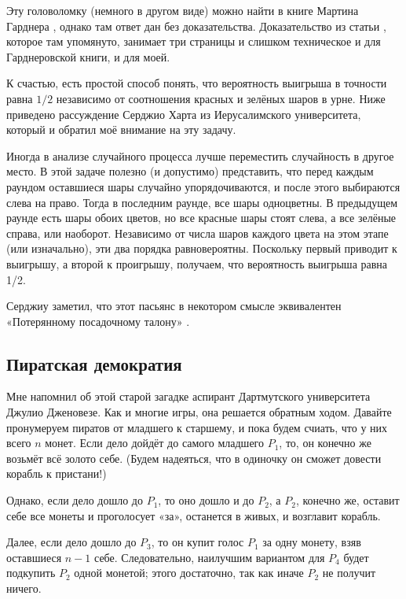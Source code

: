 Эту головоломку (немного в другом виде) можно найти в книге Мартина Гарднера \cite[2.16]{gardner2005}, однако там ответ дан без доказательства.
Доказательство из статьи \cite{oakley-perry}, которое там упомянуто, занимает три страницы и слишком техническое и для Гарднеровской книги, и для моей.

К счастью, есть простой способ понять, что вероятность выигрыша в точности равна $1/2$ независимо от соотношения красных и зелёных шаров в урне.
Ниже приведено рассуждение Серджио Харта из Иерусалимского университета, который и обратил моё внимание на эту задачу.

Иногда в анализе случайного процесса лучше переместить случайность в другое место.
В этой задаче полезно (и допустимо) представить, что перед каждым раундом оставшиеся шары случайно упорядочиваются, и после этого выбираются слева на право.
Тогда в последним раунде, все шары одноцветны.
В предыдущем раунде есть шары обоих цветов, но все красные шары стоят слева, а все зелёные справа, или наоборот.
Независимо от числа шаров каждого цвета на этом этапе (или изначально), эти два порядка равновероятны.
Поскольку первый приводит к выигрышу, а второй к проигрышу, получаем, что вероятность выигрыша равна 1/2.

Серджиу заметил, что этот пасьянс в некотором смысле эквивалентен «Потерянному посадочному талону» \cite[p. 35]{winkler}.

\subsection*{Пиратская демократия}

Мне напомнил об этой старой загадке аспирант Дартмутского университета Джулио Дженовезе.
Как и многие игры, она решается обратным ходом.
Давайте пронумеруем пиратов от младшего к старшему, и пока будем счиать, что у них всего $n$ монет.
Если дело дойдёт до самого младшего $P_1$, то, он конечно же возьмёт всё золото себе.
(Будем надеяться, что в одиночку он сможет довести корабль к пристани!)

Однако, если дело дошло до $P_1$, то оно дошло и до $P_2$, а
$P_2$, конечно же, оставит себе все монеты и проголосует «за», останется в живых, и возглавит корабль.

Далее, если дело дошло до $P_3$, то он купит голос $P_1$ за одну монету, взяв оставшиеся $n - 1$ себе.
Следовательно, наилучшим вариантом для $P_4$ будет подкупить $P_2$ одной монетой;
этого достаточно, так как иначе $P_2$ не получит ничего.

